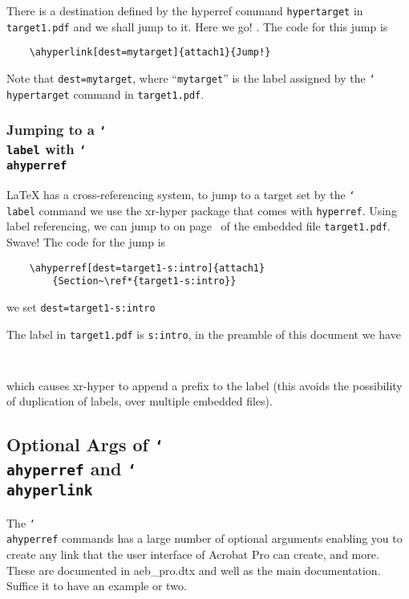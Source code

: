 \documentclass{article}
\newcommand{\cs}[1]{\texttt{\char`\\#1}}
\begin{document}
There is a destination defined by the hyperref command
\texttt{hypertarget} in \texttt{target1.pdf} and we shall jump to
it. Here we go! . The
code for this jump is
\begin{verbatim}
    \ahyperlink[dest=mytarget]{attach1}{Jump!}
\end{verbatim}
\noindent Note that \texttt{dest=mytarget}, where ``\texttt{mytarget}'' is the
label assigned by the \cs{hypertarget} command in \texttt{target1.pdf}.


\subsubsection{Jumping to a \texorpdfstring{\protect\cs{label}}{\textbackslash label}
with \texorpdfstring{\protect\cs{ahyperref}}{\textbackslash ahyperref}}

{\LaTeX} has a cross-referencing system, to jump to a target set by
the \cs{label} command we use the \textsf{xr-hyper} package that
comes with \texttt{hyperref}. Using label referencing, we can jump to
on page~\pageref*{target1-s:intro} of the embedded file
\texttt{target1.pdf}. Swave! The code for the jump is
\begin{verbatim}
    \ahyperref[dest=target1-s:intro]{attach1}
        {Section~\ref*{target1-s:intro}}
\end{verbatim}
\noindent we set \verb!dest=target1-s:intro!

The label in \texttt{target1.pdf} is \texttt{s:intro}, in the preamble of
this document we have
\begin{verbatim}
    
\end{verbatim}
\noindent which causes \textsf{xr-hyper} to append a prefix to the label (this
avoids the possibility of duplication of labels, over multiple
embedded files).

\goodbreak
\subsection{Optional Args of \texorpdfstring{\protect\cs{ahyperref}}{\textbackslash ahyperref}
and \texorpdfstring{\protect\cs{ahyperlink}}{\textbackslash ahpyerlink}}

The \cs{ahyperref} commands has a large number of optional arguments
enabling you to create any link that the user interface of Acrobat
Pro can create, and more. These are documented in
\textsf{aeb\_pro.dtx} and well as the main documentation. Suffice it
to have an example or two.
\end{document}
